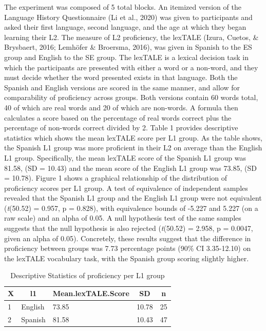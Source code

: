 \documentclass[
  man]{apa6}
\begin{document}
The experiment was composed of 5 total blocks.
An itemized version of the Language History Questionnaire (Li et al., 2020) was given to participants and asked their first language, second language, and the age at which they began learning their L2.
The measure of L2 proficiency, the lexTALE (Izura, Cuetos, \& Brysbaert, 2016; Lemhöfer \& Broersma, 2016), was given in Spanish to the ES group and English to the SE group.
The lexTALE is a lexical decision task in which the participants are presented with either a word or a non-word, and they must decide whether the word presented exists in that language.
Both the Spanish and English versions are scored in the same manner, and allow for comparability of proficiency across groups. Both versions contain 60 words total, 40 of which are real words and 20 of which are non-words. A formula then calculates a score based on the percentage of real words correct plus the percentage of non-words correct divided by 2. Table 1 provides descriptive statistics which shows the mean lexTALE score per L1 group. As the table shows, the Spanish L1 group was more proficient in their L2 on average than the English L1 group. Specifically, the mean lexTALE score of the Spanish L1 group was 81.58, (SD = 10.43) and the mean score of the English L1 group was 73.85, (SD = 10.78).
Figure 1 shows a graphical relationship of the distribution of proficiency scores per L1 group. A test of equivalence of independent samples revealed that the Spanish L1 group and the English L1 group were not equivalent (\emph{t}(50.52) = 0.957, p = 0.828), with equivalence bounds of -5.227 and 5.227 (on a raw scale) and an alpha of 0.05. A null hypothesis test of the same samples suggests that the null hypothesis is also rejected (\emph{t}(50.52) = 2.958, p = 0.0047, given an alpha of 0.05). Concretely, these results suggest that the difference in proficiency between groups was 7.73 percentage points (90\% CI 3.35-12.10) on the lexTALE vocabulary task, with the Spanish group scoring slightly higher.

\begin{table}[tbp]

\begin{center}
\begin{threeparttable}

\caption{\label{tab:unnamed-chunk-1}Descriptive Statistics of proficiency per L1 group}

\begin{tabular}{lllll}
\toprule
X & \multicolumn{1}{c}{l1} & \multicolumn{1}{c}{Mean.lexTALE.Score} & \multicolumn{1}{c}{SD} & \multicolumn{1}{c}{n}\\
\midrule
1 & English & 73.85 & 10.78 & 25\\
2 & Spanish & 81.58 & 10.43 & 47\\
\bottomrule
\end{tabular}

\end{threeparttable}
\end{center}

\end{table}
\end{document}
